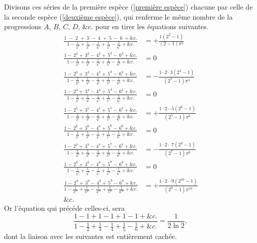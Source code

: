 \documentclass[12pt]{article}
\theoremstyle{definition}
\begin{document}
Divisons ces séries de la première espèce (\ref{première espèce}) chacune par celle de la seconde espèce (\ref{deuxième espèce}), qui renferme le même nombre de la progressions $A$, $B$, $C$, $D$, \&c. pour en tirer les équations suivantes.
\begin{align*}
  \frac{1 \; - \; 2 \; + \; 3 \;- \; 4 \; + \; 5 \,  - \;  6 \; + \&c.}{\displaystyle 1 - \frac{1}{2^2} + \frac{1}{3^2} - \frac{1}{4^2} + \frac{1}{5^2} - \frac{1}{6^2} + \&c.} &= + \frac{1(2^2-1)}{(2-1)\pi^2} \\
  \frac{1 - \, 2^2 + \, 3^2- \, 4^2 + \, 5^2  - \,  6^2 + \&c.}{\displaystyle 1 - \frac{1}{2^3} + \frac{1}{3^3} - \frac{1}{4^3} + \frac{1}{5^3} - \frac{1}{6^3} + \&c.} &= 0 \\
  \frac{1 - \, 2^3 + \, 3^3- \, 4^3 + \, 5^3  - \,  6^3 + \&c.}{\displaystyle 1 - \frac{1}{2^4} + \frac{1}{3^4} - \frac{1}{4^4} + \frac{1}{5^4} - \frac{1}{6^4} + \&c.} &= - \frac{1\cdot 2 \cdot 3(2^4 - 1)}{(2^3 - 1)\pi^4} \\
  \frac{1 - \, 2^4 + \, 3^4- \, 4^4 + \, 5^4  - \,  6^4 + \&c.}{\displaystyle 1 - \frac{1}{2^5} + \frac{1}{3^5} - \frac{1}{4^5} + \frac{1}{5^5} - \frac{1}{6^5} + \&c.} &= 0 \\
  \frac{1 - \, 2^5 + \, 3^5- \, 4^5 + \, 5^5  - \,  6^5 + \&c.}{\displaystyle 1 - \frac{1}{2^6} + \frac{1}{3^6} - \frac{1}{4^6} + \frac{1}{5^6} - \frac{1}{6^6} + \&c.} &= + \frac{1\cdot 2 \cdot \cdot 5(2^6 - 1)}{(2^5 - 1)\pi^6} \\
  \frac{1 - \, 2^6 + \, 3^6- \, 4^6 + \, 5^6  - \,  6^6 + \&c.}{\displaystyle 1 - \frac{1}{2^7} + \frac{1}{3^7} - \frac{1}{4^7} + \frac{1}{5^7} - \frac{1}{6^7} + \&c.} &= 0 \\
  \frac{1 - \, 2^7 + \, 3^7- \, 4^7 + \, 5^7  - \,  6^7 + \&c.}{\displaystyle 1 - \frac{1}{2^8} + \frac{1}{3^8} - \frac{1}{4^8} + \frac{1}{5^8} - \frac{1}{6^8} + \&c.} &= - \frac{1\cdot 2 \cdot \cdot 7(2^8 - 1)}{(2^7 - 1)\pi^8} \\
  \frac{1 - \, 2^8 + \, 3^8- \, 4^8 + \, 5^8  - \,  6^8 + \&c.}{\displaystyle 1 - \frac{1}{2^9} + \frac{1}{3^9} - \frac{1}{4^9} + \frac{1}{5^9} - \frac{1}{6^9} + \&c.} &= 0 \\
  \frac{1 - \, 2^9 + \, 3^9- \, 4^9 + \, 5^9  - \,  6^9 + \&c.}{\displaystyle 1 - \frac{1}{2^{10}} + \frac{1}{3^{10}} - \frac{1}{4^{10}} + \frac{1}{5^{10}} - \frac{1}{6^{10}} + \&c.} &= + \frac{1\cdot 2 \cdot \cdot 9(2^{10} - 1)}{(2^9 - 1)\pi^{10}} \\
  \&c. \qquad \qquad \quad &
\end{align*}
Or l'équation qui précéde celles-ci, sera
$$\frac{1 - 1 + 1 - 1 + 1 - 1 + \&c. }{1 - \frac{1}{2} + \frac{1}{3} - \frac{1}{4} + \frac{1}{5} - \frac{1}{6} + \&c. } = \frac{1}{2\ln 2},$$
dont la liaison avec les suivantes est entièrement cachée.
\end{document}
